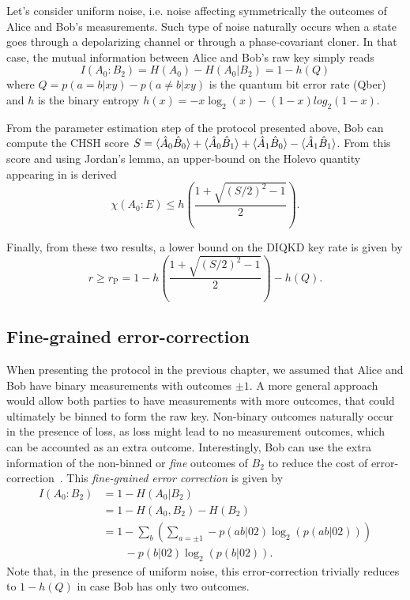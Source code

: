 Let's consider uniform noise, i.e. noise affecting symmetrically the outcomes of Alice and Bob's measurements.
Such type of noise naturally occurs when a state goes through a depolarizing channel or through a phase-covariant cloner.
In that case, the mutual information between Alice and Bob's raw key simply reads
\begin{equation}
	I(A_0 : B_2) = H(A_0) - H(A_0|B_2) = 1 - h(Q)
\end{equation}
where $Q=p(a=b|xy)-p(a\neq b |xy)$ is the quantum bit error rate (Qber) and $h$ is the binary entropy $h(x)=-x \log_2(x) - (1-x)log_2(1-x)$.

From the parameter estimation step of the protocol presented above, Bob can compute the CHSH score $S=\langle {\hat{A}_0 \hat{B}_0} \rangle + \langle {\hat{A}_0 \hat{B}_1} \rangle + \langle {\hat{A}_1 \hat{B}_0} \rangle - \langle {\hat{A}_1 \hat{B}_1} \rangle$.
From this score and using Jordan's lemma, an upper-bound on the Holevo quantity appearing in  is derived
\begin{equation}
	\chi(A_0 : E) \leq h\left(\frac{1+\sqrt{(S/2)^2-1}}{2} \right).
	\label{eq:holevo_pironio}
\end{equation}

Finally, from these two results, a lower bound on the DIQKD key rate is given by
\begin{equation}
	r \geq r_\mathrm{P} = 1 - h\left(\frac{1+\sqrt{(S/2)^2-1}}{2} \right) - h(Q).
	\label{eq:pironio}
\end{equation}

\subsection{Fine-grained error-correction}
\label{sec:Ma_Lutk}

When presenting the protocol in the previous chapter, we assumed that Alice and Bob have binary measurements with outcomes $\pm 1$.
A more general approach would allow both parties to have measurements with more outcomes, that could ultimately be binned to form the raw key.
Non-binary outcomes naturally occur in the presence of loss, as loss might lead to no measurement outcomes, which can be accounted as an extra outcome.
Interestingly, Bob can use the extra information of the non-binned or \textit{fine} outcomes of $B_2$ to reduce the cost of error-correction~\cite{Ma2012}.
This \textit{fine-grained error correction} is given by
\begin{equation}
	\begin{split}
		I(A_0 : B_2) &= 1-H(A_0|B_2) \\
					 &= 1-H(A_0,B_2) - H(B_2) \\
					 &= 1-\sum_b \left( \sum_{a = \pm1} -p(ab|02)\log_2(p(ab|02)) \right) \\
					 &\qquad - p(b|02)\log_2(p(b|02)).
	\end{split}
	\label{eq:Ma}
\end{equation}
Note that, in the presence of uniform noise, this error-correction trivially reduces to $1-h(Q)$ in case Bob has only two outcomes.

